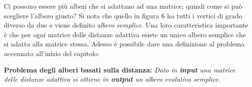 \newline
Ci possono essere più alberi che si adattano ad una matrice, quindi come si può scegliere l'albero giusto? Si nota che quello in figura 6 ha tutti i vertici di grado diverso da due e viene definito \textit{albero semplice}. 
\newpage
Una loro caratteristica importante è che per ogni matrice delle distanze adattiva esiste un unico albero semplice che si adatta alla matrice stessa.
\newline
Adesso è possibile dare una definizione al problema accennato all'inizio del capitolo:
\begin{center}
\textbf{Problema degli alberi basati sulla distanza:}
\newline
\textit{Dato in \textbf{input} una matrice delle distanze adattiva si ottiene in \textbf{output} un albero evolutivo semplice.}
\end{center}

